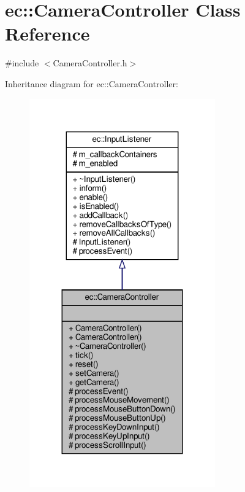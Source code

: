 \hypertarget{classec_1_1_camera_controller}{}\section{ec\+:\+:Camera\+Controller Class Reference}
\label{classec_1_1_camera_controller}


{\ttfamily \#include $<$Camera\+Controller.\+h$>$}



Inheritance diagram for ec\+:\+:Camera\+Controller\+:\nopagebreak
\begin{figure}[H]
\begin{center}
\leavevmode
\includegraphics[width=227pt]{classec_1_1_camera_controller__inherit__graph}
\end{center}
\end{figure}


